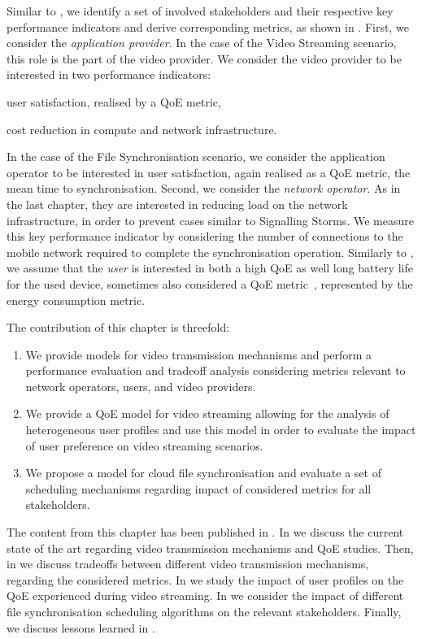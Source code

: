 Similar to , we identify a set of involved stakeholders and their respective key performance indicators and derive corresponding metrics, as shown in .
First, we consider the \emph{application provider}.
In the case of the Video Streaming scenario, this role is the part of the video provider.
We consider the video provider to be interested in two performance indicators:
\begin{enumerate*}
\item user satisfaction, realised by a \gls{QoE} metric,
\item cost reduction in compute and network infrastructure.
\end{enumerate*}
In the case of the File Synchronisation scenario, we consider the application operator to be interested in user satisfaction, again realised as a \gls{QoE} metric, the mean time to synchronisation.
Second, we consider the \emph{network operator}.
As in the last chapter, they are interested in reducing load on the network infrastructure, in order to prevent cases similar to Signalling Storms.
We measure this key performance indicator by considering the number of connections to the mobile network required to complete the synchronisation operation.
Similarly to , we assume that the \emph{user} is interested in both a high \gls{QoE} as well long battery life for the used device, sometimes also considered a \gls{QoE} metric~\cite{Ickin2012}, represented by the energy consumption metric.

The contribution of this chapter is threefold:
\begin{enumerate}
\item We provide models for video transmission mechanisms and perform a performance evaluation and tradeoff analysis considering metrics relevant to network operators, users, and video providers.
\item We provide a \gls{QoE} model for video streaming allowing for the analysis of heterogeneous user profiles and use this model in order to evaluate the impact of user preference on video streaming scenarios.
\item We propose a model for cloud file synchronisation and evaluate a set of scheduling mechanisms regarding impact of considered metrics for all stakeholders.
\end{enumerate}

The content from this chapter has been published in \cite{Schwartz2013b, Hossfeld2015, Schwartz2014a}.
In  we discuss the current state of the art regarding video transmission mechanisms and \gls{QoE} studies.
Then, in  we discuss tradeoffs between different video transmission mechanisms, regarding the considered metrics.
In  we study the impact of user profiles on the \gls{QoE} experienced during video streaming.
In  we consider the impact of different file synchronisation scheduling algorithms on the relevant stakeholders.
Finally, we discuss lessons learned in .






